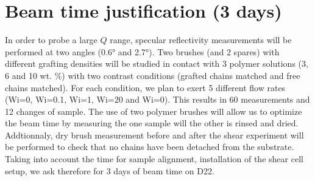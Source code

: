\documentclass[12pt]{article}
\begin{document}
\section*{Beam time justification (3 days)}
In order to probe a large $Q$ range, specular reflectivity measurements will be performed at two angles (0.6° and 2.7°). Two brushes (and 2 spares) with different grafting densities will be studied in contact with 3 polymer solutions (3, 6 and 10 wt. \%) with two contrast conditions (grafted chains matched and free chains matched). For each condition, we plan to exert 5 different flow rates (Wi=0, Wi=0.1, Wi=1, Wi=20 and Wi=0). This results in 60 measurements and 12 changes of sample. The use of two polymer brushes will allow us to optimize the beam time by measuring the one sample will the other is rinsed and dried. Addtionnaly, dry brush measurement before and after the shear experiment will be performed to check that no chains have been detached from the substrate. Taking into account the time for sample alignment, installation of the shear cell setup, we ask therefore for 3 days of beam time on D22.


\scriptsize 
\end{document}
